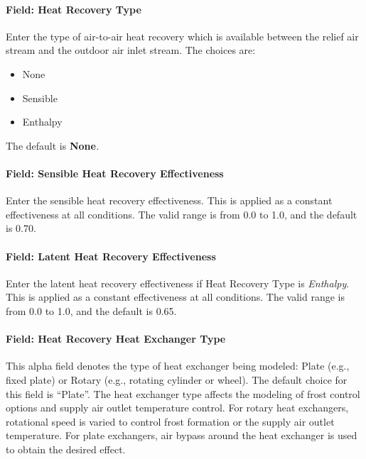 \paragraph{Field: Heat Recovery Type}\label{field-heat-recovery-type-3}

Enter the type of air-to-air heat recovery which is available between the relief air stream and the outdoor air inlet stream. The choices are:

\begin{itemize}
\item
  None
\item
  Sensible
\item
  Enthalpy
\end{itemize}

The default is \textbf{None}\emph{.}

\paragraph{Field: Sensible Heat Recovery Effectiveness}\label{field-sensible-heat-recovery-effectiveness-3}

Enter the sensible heat recovery effectiveness. This is applied as a constant effectiveness at all conditions. The valid range is from 0.0 to 1.0, and the default is 0.70.

\paragraph{Field: Latent Heat Recovery Effectiveness}\label{field-latent-heat-recovery-effectiveness-3}

Enter the latent heat recovery effectiveness if Heat Recovery Type is \emph{Enthalpy}. This is applied as a constant effectiveness at all conditions. The valid range is from 0.0 to 1.0, and the default is 0.65.

\paragraph{Field: Heat Recovery Heat Exchanger Type}\label{field-heat-recovery-heat-exchanger-type}

This alpha field denotes the type of heat exchanger being modeled: Plate (e.g., fixed plate) or Rotary (e.g., rotating cylinder or wheel). The default choice for this field is ``Plate''. The heat exchanger type affects the modeling of frost control options and supply air outlet temperature control. For rotary heat exchangers, rotational speed is varied to control frost formation or the supply air outlet temperature. For plate exchangers, air bypass around the heat exchanger is used to obtain the desired effect.

